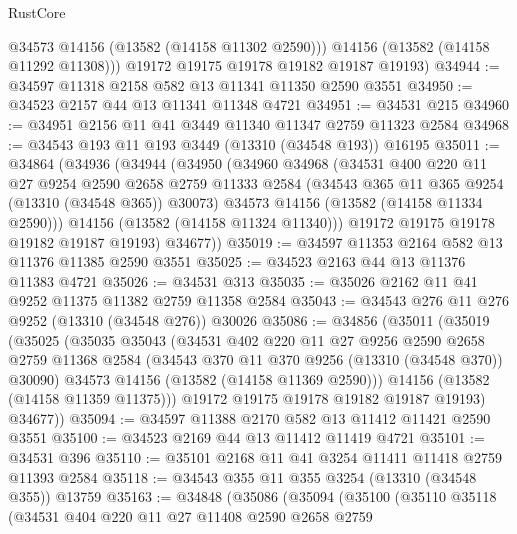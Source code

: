 \begin{lexlean}{RustCore}
\begin{coremodule}
          @34573
          @14156
          (@13582 (@14158 @11302 @2590)))
        @14156
        (@13582 (@14158 @11292 @11308)))
      @19172
      @19175
      @19178
      @19182
      @19187
      @19193)
@34944 := @34597 @11318 @2158 @582 @13 @11341 @11350 @2590 @3551
@34950 := @34523 @2157 @44 @13 @11341 @11348 @4721
@34951 := @34531 @215
@34960 := @34951 @2156 @11 @41 @3449 @11340 @11347 @2759 @11323 @2584
@34968 := @34543 @193 @11 @193 @3449 (@13310 (@34548 @193)) @16195
@35011 := @34864
    (@34936
      (@34944
        (@34950
          (@34960
            @34968
            (@34531
              @400
              @220
              @11
              @27
              @9254
              @2590
              @2658
              @2759
              @11333
              @2584
              (@34543 @365 @11 @365 @9254 (@13310 (@34548 @365)) @30073)
              @34573
              @14156
              (@13582 (@14158 @11334 @2590)))
            @14156
            (@13582 (@14158 @11324 @11340)))
          @19172
          @19175
          @19178
          @19182
          @19187
          @19193)
        @34677))
@35019 := @34597 @11353 @2164 @582 @13 @11376 @11385 @2590 @3551
@35025 := @34523 @2163 @44 @13 @11376 @11383 @4721
@35026 := @34531 @313
@35035 := @35026 @2162 @11 @41 @9252 @11375 @11382 @2759 @11358 @2584
@35043 := @34543 @276 @11 @276 @9252 (@13310 (@34548 @276)) @30026
@35086 := @34856
    (@35011
      (@35019
        (@35025
          (@35035
            @35043
            (@34531
              @402
              @220
              @11
              @27
              @9256
              @2590
              @2658
              @2759
              @11368
              @2584
              (@34543 @370 @11 @370 @9256 (@13310 (@34548 @370)) @30090)
              @34573
              @14156
              (@13582 (@14158 @11369 @2590)))
            @14156
            (@13582 (@14158 @11359 @11375)))
          @19172
          @19175
          @19178
          @19182
          @19187
          @19193)
        @34677))
@35094 := @34597 @11388 @2170 @582 @13 @11412 @11421 @2590 @3551
@35100 := @34523 @2169 @44 @13 @11412 @11419 @4721
@35101 := @34531 @396
@35110 := @35101 @2168 @11 @41 @3254 @11411 @11418 @2759 @11393 @2584
@35118 := @34543 @355 @11 @355 @3254 (@13310 (@34548 @355)) @13759
@35163 := @34848
    (@35086
      (@35094
        (@35100
          (@35110
            @35118
            (@34531
              @404
              @220
              @11
              @27
              @11408
              @2590
              @2658
              @2759

\end{coremodule}
\end{lexlean}
